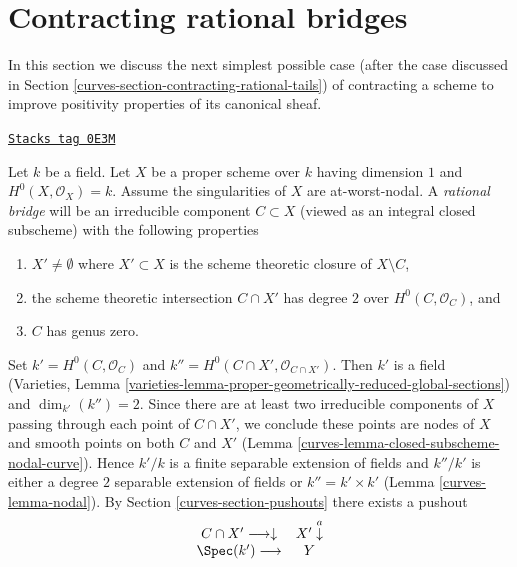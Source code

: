 \section{Contracting rational bridges}
\label{curves-section-contracting-rational-bridges}
In this section we discuss the next simplest possible case (after the case
discussed in Section \ref{curves-section-contracting-rational-tails}) of contracting
a scheme to improve positivity properties of its canonical sheaf.

\begin{example}

\label{curves-example-rational-bridge}
\href{https://stacks.math.columbia.edu/tag/0E3M}{\texttt{Stacks tag 0E3M}}

Let $k$ be a field. Let $X$ be a proper scheme over $k$ having dimension $1$
and $H^0(X, \mathcal{O}_X) = k$. Assume the singularities of $X$ are
at-worst-nodal.
A {\it rational bridge} will be an irreducible component $C \subset X$
(viewed as an integral closed subscheme) with the following properties
\begin{enumerate}
\item $X' \not = \emptyset$ where $X' \subset X$ is the scheme theoretic closure
of $X \setminus C$,
\item the scheme theoretic intersection $C \cap X'$
has degree $2$ over $H^0(C, \mathcal{O}_C)$, and
\item $C$ has genus zero.
\end{enumerate}
Set $k' = H^0(C, \mathcal{O}_C)$ and
$k'' = H^0(C \cap X', \mathcal{O}_{C \cap X'})$.
Then $k'$ is a field (Varieties, Lemma
\ref{varieties-lemma-proper-geometrically-reduced-global-sections})
and $\dim_{k'}(k'') = 2$. Since there are at least
two irreducible components of $X$ passing through
each point of $C \cap X'$, we conclude these points are nodes of $X$
and smooth points on both $C$ and $X'$
(Lemma \ref{curves-lemma-closed-subscheme-nodal-curve}).
Hence $k'/k$ is a finite separable extension of fields
and $k''/k'$ is either a degree $2$ separable extension of fields
or $k'' = k' \times k'$ (Lemma \ref{curves-lemma-nodal}). By
Section \ref{curves-section-pushouts} there exists a pushout
$$
\begin{array}{cc}C \cap X' \longrightarrow\downarrow & X' \overset{a}{\downarrow} \\ \Spec(k') \longrightarrow & Y\end{array}
$$
\end{example}
